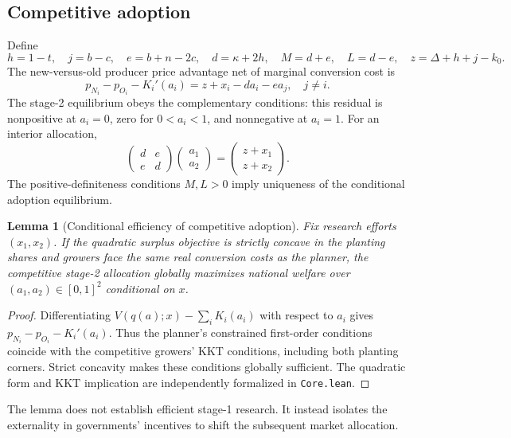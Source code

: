 \documentclass[11pt]{article}
\newtheorem{lemma}{Lemma}
\begin{document}
\subsection{Competitive adoption}
Define
\begin{equation}
 h=1-t,\quad j=b-c,\quad e=b+n-2c,\quad
 d=\kappa+2h,\quad M=d+e,\quad L=d-e,\quad
 z=\Delta+h+j-k_0.
 \label{eq:notation}
\end{equation}
The new-versus-old producer price advantage net of marginal conversion cost is
\begin{equation}
 p_{N_i}-p_{O_i}-K_i'(a_i)=z+x_i-d a_i-e a_j,\quad j\ne i.
 \label{eq:adoptionfoc}
\end{equation}
The stage-2 equilibrium obeys the complementary conditions: this residual is nonpositive at $a_i=0$, zero for $0<a_i<1$, and nonnegative at $a_i=1$. For an interior allocation,
\begin{equation}
 \begin{pmatrix}d&e\\e&d\end{pmatrix}
 \begin{pmatrix}a_1\\a_2\end{pmatrix}
 =\begin{pmatrix}z+x_1\\z+x_2\end{pmatrix}.
 \label{eq:adoptionmatrix}
\end{equation}
The positive-definiteness conditions $M,L>0$ imply uniqueness of the conditional adoption equilibrium.

\begin{lemma}[Conditional efficiency of competitive adoption]
Fix research efforts $(x_1,x_2)$. If the quadratic surplus objective is strictly concave in the planting shares and growers face the same real conversion costs as the planner, the competitive stage-2 allocation globally maximizes national welfare over $(a_1,a_2)\in[0,1]^2$ conditional on $x$.
\end{lemma}
\begin{proof}
Differentiating $V(q(a);x)-\sum_iK_i(a_i)$ with respect to $a_i$ gives $p_{N_i}-p_{O_i}-K_i'(a_i)$. Thus the planner's constrained first-order conditions coincide with the competitive growers' KKT conditions, including both planting corners. Strict concavity makes these conditions globally sufficient. The quadratic form and KKT implication are independently formalized in \texttt{Core.lean}.
\end{proof}
The lemma does not establish efficient stage-1 research. It instead isolates the externality in governments' incentives to shift the subsequent market allocation.
\end{document}
